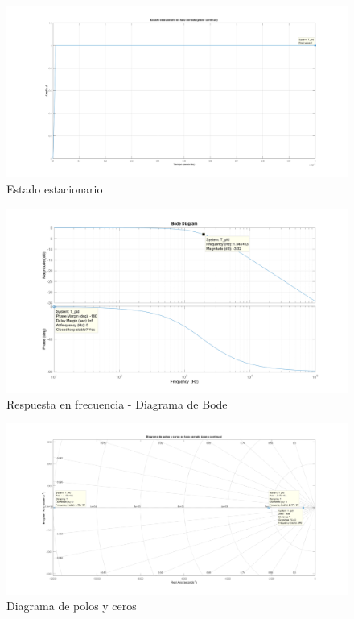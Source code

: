 \documentclass[12pt]{report}
\begin{document}

	\begin{figure}
		\centering
		\includegraphics[width=\textwidth,height=\textheight,keepaspectratio]{buck_steady_state} 
		\caption{Estado estacionario}
		\label{buck:steady_state}
	\end{figure}
	
	\begin{figure}
		\centering
		\includegraphics[width=\textwidth,height=\textheight,keepaspectratio]{buck_bode} 
		\caption{Respuesta en frecuencia - Diagrama de Bode}
		\label{buck:bode}
	\end{figure}
	
	\begin{figure}
		\centering
		\includegraphics[width=\textwidth,height=\textheight,keepaspectratio]{buck_polos_ceros} 
		\caption{Diagrama de polos y ceros}
		\label{buck:polos_ceros}
	\end{figure}
\end{document}
